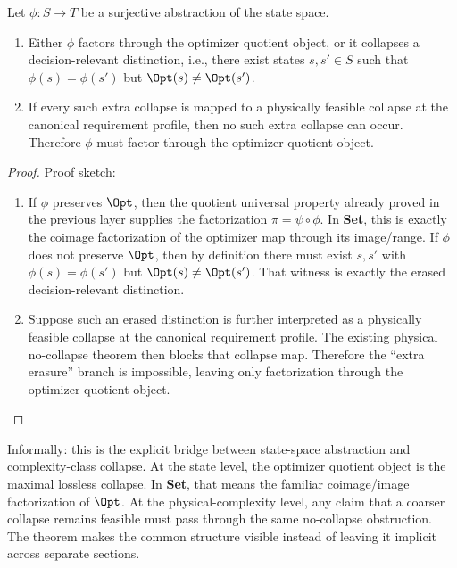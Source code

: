 \begin{theorem}\label{thm:abstraction-boundary}
Let $\phi : S \to T$ be a surjective abstraction of the state space.

\begin{enumerate}
\item Either $\phi$ factors through the optimizer quotient object, or it collapses a decision-relevant distinction, i.e., there exist states $s,s' \in S$ such that $\phi(s)=\phi(s')$ but $\Opt(s)\neq\Opt(s')$.
\item If every such extra collapse is mapped to a physically feasible collapse at the canonical requirement profile, then no such extra collapse can occur. Therefore $\phi$ must factor through the optimizer quotient object.
\end{enumerate}
\end{theorem}

\begin{proof}
Proof sketch:
\begin{enumerate}
\item If $\phi$ preserves $\Opt$, then the quotient universal property already proved in the previous layer supplies the factorization $\pi = \psi \circ \phi$. In \textbf{Set}, this is exactly the coimage factorization of the optimizer map through its image/range. If $\phi$ does not preserve $\Opt$, then by definition there must exist $s,s'$ with $\phi(s)=\phi(s')$ but $\Opt(s)\neq\Opt(s')$. That witness is exactly the erased decision-relevant distinction.
\item Suppose such an erased distinction is further interpreted as a physically feasible collapse at the canonical requirement profile. The existing physical no-collapse theorem then blocks that collapse map. Therefore the ``extra erasure'' branch is impossible, leaving only factorization through the optimizer quotient object.
\end{enumerate}
\end{proof}

Informally: this is the explicit bridge between state-space abstraction and complexity-class collapse. At the state level, the optimizer quotient object is the maximal lossless collapse. In \textbf{Set}, that means the familiar coimage/image factorization of $\Opt$. At the physical-complexity level, any claim that a coarser collapse remains feasible must pass through the same no-collapse obstruction. The theorem makes the common structure visible instead of leaving it implicit across separate sections.

